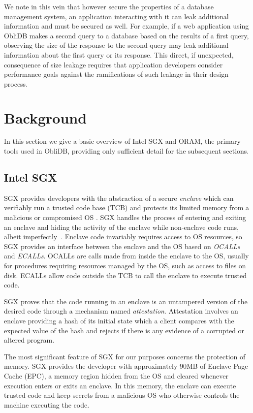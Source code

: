 \documentclass[letterpaper,twocolumn,10pt]{article}
\def\name/{ObliDB}
\begin{document}
We note in this vein that however secure the properties of a database management system, an application interacting with it can leak additional information and must be secured as well. For example, if a web application using \name/ makes a second query to a database based on the results of a first query, observing the size of the response to the second query may leak additional information about the first query or its response. This direct, if unexpected, consequence of size leakage requires that application developers consider performance goals against the ramifications of such leakage in their design process.

\section{Background}\label{background}
In this section we give a basic overview of Intel SGX and ORAM, the primary tools used in \name/, providing only sufficient detail for the subsequent sections.

\subsection{Intel SGX}

SGX provides developers with the abstraction of a secure \textit{enclave} which can verifiably run a trusted code base (TCB) and protects its limited memory from a malicious or compromised OS \cite{CD16, SGXRef}. SGX handles the process of entering and exiting an enclave and hiding the activity of the enclave while non-enclave code runs, albeit imperfectly~\cite{LSG+16}. Enclave code invariably requires access to OS resources, so SGX provides an interface between the enclave and the OS based on \textit{OCALLs} and \textit{ECALLs}. OCALLs are calls made from inside the enclave to the OS, usually for procedures requiring resources managed by the OS, such as access to files on disk. ECALLs allow code outside the TCB to call the enclave to execute trusted code.

SGX proves that the code running in an enclave is an untampered version of the desired code through a mechanism named \textit{attestation}. Attestation involves an enclave providing a hash of its initial state which a client compares with the expected value of the hash and rejects if there is any evidence of a corrupted or altered program.

The most significant feature of SGX for our purposes concerns the protection of memory. SGX provides the developer with approximately 90MB of Enclave Page Cache (EPC), a memory region hidden from the OS and cleared whenever execution enters or exits an enclave. In this memory, the enclave can execute trusted code and keep secrets from a malicious OS who otherwise controls the machine executing the code.
\end{document}
